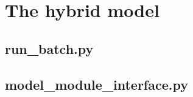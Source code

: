 \section{The hybrid model}
\label{sec:}

\subsection{run\_batch.py}




\subsection{model\_module\_interface.py}


